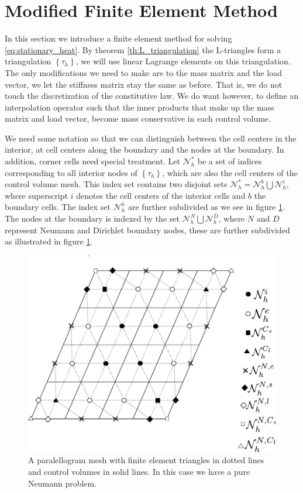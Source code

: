 \documentclass[../Main/main.tex]{subfiles}
\begin{document}
	\section{Modified Finite Element Method}
	In this section we introduce a finite element method for solving \eqref{eq:stationary_heat}. By theorem \ref{th:L_triangulation} the L-triangles form a triangulation $\left \{ \tau_h \right \}$, we will use linear Lagrange elements on this triangulation. The only modifications we need to make are to the mass matrix and the load vector, we let the stiffness matrix stay the same as before. That is, we do not touch the discretization of the constitutive law. We do want however, to define an interpolation operator such that the inner products that make up the mass matrix and load vector, become mass conservative in each control volume. 
	\par
	We need some notation so that we can distinguish between the cell centers in the interior, at cell centers along the boundary and the nodes at the boundary. In addition, corner cells need special treatment. 
	Let $\mathcal{N}_h^*$ be a set of indices corresponding to all interior nodes of $\left \{ \tau_h \right \}$, which are also the cell centers of the control volume mesh. This index set contains two disjoint sets $\mathcal{N}_h^* = \mathcal{N}_h^b \bigcup \mathcal{N}_h^i$, where superscript $i$ denotes the cell centers of the interior cells and $b$ the boundary cells. The index set $\mathcal{N}^b_h$ are further subdivided as we see in figure \ref{fig:mesWithNodes}. The nodes at the boundary is indexed by the set $\mathcal{N}_h^N \bigcup \mathcal{N}_h^D$, where $N$ and $D$ represent Neumann and Dirichlet boundary nodes, these are further subdivided as illustrated in figure \ref{fig:mesWithNodes}.
	\begin{figure}[H]
		\centering
		\includegraphics{meshWithNodes.pdf}

		\caption{A paralellogram mesh with finite element triangles in dotted lines and control volumes in solid lines. In this case we have a pure Neumann problem.}
		\label{fig:mesWithNodes}
	\end{figure}
\end{document}
